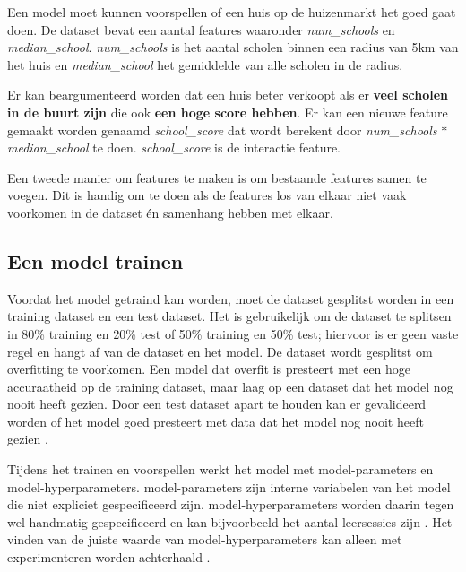 \begin{quoting}
  Een model moet kunnen voorspellen of een huis op de huizenmarkt het goed gaat doen. De dataset bevat een aantal features waaronder \textit{num\_schools} en \textit{median\_school}. \textit{num\_schools} is het aantal scholen binnen een radius van 5km van het huis en \textit{median\_school} het gemiddelde van alle scholen in de radius.
  
  Er kan beargumenteerd worden dat een huis beter verkoopt als er \textbf{veel scholen in de buurt zijn} die ook \textbf{een hoge score hebben}. Er kan een nieuwe feature gemaakt worden genaamd \textit{school\_score} dat wordt berekent door \textit{num\_schools} \(*\) \textit{median\_school} te doen. \textit{school\_score} is de interactie feature.
\end{quoting}

Een tweede manier om features te maken is om bestaande features samen te voegen. Dit is handig om te doen als de features los van elkaar niet vaak voorkomen in de dataset én samenhang hebben met elkaar. 

\subsection{Een model trainen}\label{subsec:model-trainen}
Voordat het model getraind kan worden, moet de dataset gesplitst worden in een training dataset en een test dataset. Het is gebruikelijk om de dataset te splitsen in 80\% training en 20\% test of 50\% training en 50\% test; hiervoor is er geen vaste regel en hangt af van de dataset en het model. De dataset wordt gesplitst om \gls{overfitting} te voorkomen. Een model dat overfit is presteert met een hoge accuraatheid op de training dataset, maar laag op een dataset dat het model nog nooit heeft gezien. Door een test dataset apart te houden kan er gevalideerd worden of het model goed presteert met data dat het model nog nooit heeft gezien \cite{data-science-primer}.

Tijdens het trainen en voorspellen werkt het model met \glspl{model-parameter} en \glspl{model-hyperparameter}. \Glspl{model-parameter} zijn interne variabelen van het model die niet expliciet gespecificeerd zijn. \Glspl{model-hyperparameter} worden daarin tegen wel handmatig gespecificeerd en kan bijvoorbeeld het aantal leersessies zijn \cite{ml-model-hyper-parameter-brownlee}. Het vinden van de juiste waarde van \glspl{model-hyperparameter} kan alleen met experimenteren worden achterhaald \cite{data-science-primer}.


